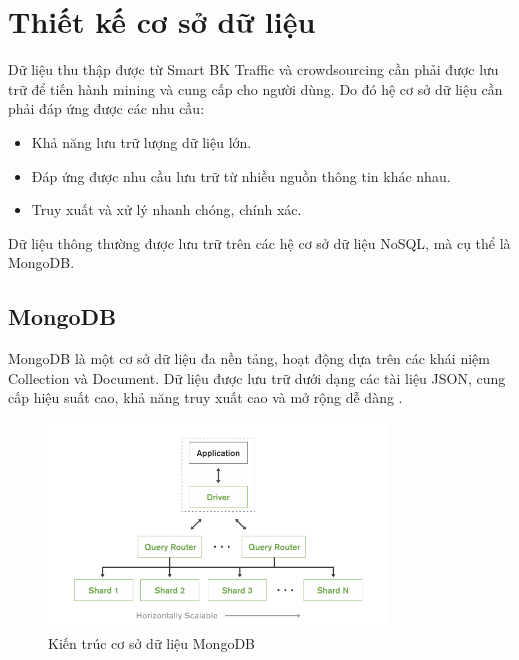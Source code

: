
\chapter{Thiết kế cơ sở dữ liệu} %

\label{Chapter5}
Dữ liệu thu thập được từ Smart BK Traffic và crowdsourcing cần phải được lưu trữ để tiến hành mining và cung cấp cho người dùng. Do đó hệ cơ sở dữ liệu cần phải đáp ứng được các nhu cầu:
\begin{itemize}
    \item Khả năng lưu trữ lượng dữ liệu lớn.
    \item Đáp ứng được nhu cầu lưu trữ từ nhiều nguồn thông tin khác nhau.
    \item Truy xuất và xử lý nhanh chóng, chính xác.
\end{itemize}
Dữ liệu thông thường được lưu trữ trên các hệ cơ sở dữ liệu NoSQL, mà cụ thể là MongoDB.

\section{MongoDB}
MongoDB là một cơ sở dữ liệu đa nền tảng, hoạt động dựa trên các khái niệm Collection và Document. Dữ liệu được lưu trữ dưới dạng các tài liệu JSON, cung cấp hiệu suất cao, khả năng truy xuất cao và mở rộng dễ dàng \cite{MongoDB1}.

\begin{figure}[H]
\centering
\includegraphics[width=0.8\textwidth]{Traffic_Report/images/image02.png}
\caption{Kiến trúc cơ sở dữ liệu MongoDB}\label{}
\end{figure}

